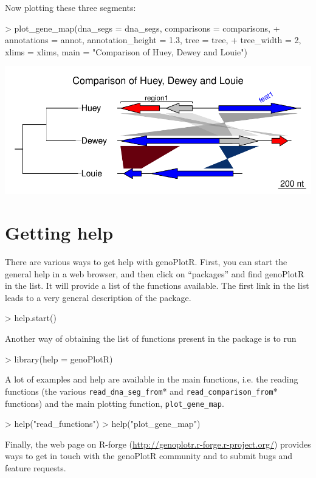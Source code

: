 \documentclass[a4paper]{article}
\newcommand{\code}[1]{\texttt{#1}}
\newcommand{\pkg}[1]{{\normalfont\fontseries{b}\selectfont #1}}
\newcommand{\genoPlotR}{\pkg{genoPlotR}}
\begin{document}
Now plotting these three segments:

\begin{Schunk}
\begin{Sinput}
> plot_gene_map(dna_segs = dna_segs, comparisons = comparisons, 
+     annotations = annot, annotation_height = 1.3, tree = tree, 
+     tree_width = 2, xlims = xlims, main = "Comparison of Huey, Dewey and Louie")
\end{Sinput}
\end{Schunk}
\begin{center}
\includegraphics{genoPlotR-004}
\end{center}

\section{Getting help}

There are various ways to get help with \genoPlotR{}. First, you can start 
the general help in a web browser, and then click on ``packages'' and 
find \genoPlotR{} in the list. It will provide a list of the functions 
available. The first link in the list leads to a very general description of
the package.
\begin{Schunk}
\begin{Sinput}
> help.start()
\end{Sinput}
\end{Schunk}
Another way of obtaining the list of functions present in the package is to run 
\begin{Schunk}
\begin{Sinput}
> library(help = genoPlotR)
\end{Sinput}
\end{Schunk}
A lot of examples and help are available in the main functions, i.e. the 
reading functions (the various \code{read\_dna\_seg\_from}* and 
\code{read\_comparison\_from}* functions) and the main plotting 
function, \code{plot\_gene\_map}.
\begin{Schunk}
\begin{Sinput}
> help("read_functions")
> help("plot_gene_map")
\end{Sinput}
\end{Schunk}
Finally, the web page on R-forge (\url{http://genoplotr.r-forge.r-project.org/})
provides ways to get in touch with the \genoPlotR{} community and to submit 
bugs and feature requests.
\end{document}
